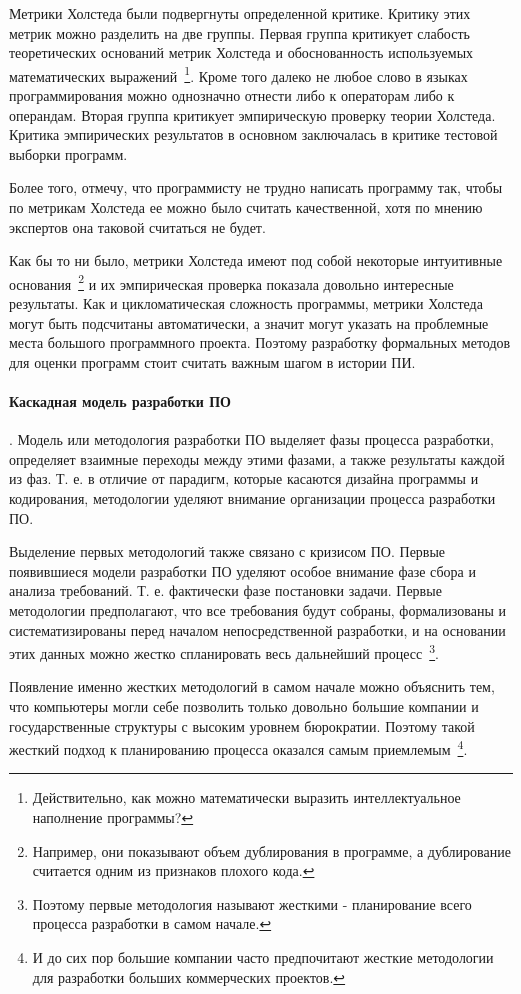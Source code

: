 Метрики Холстеда были подвергнуты определенной критике. Критику этих метрик можно разделить на две группы. Первая группа критикует слабость теоретических оснований метрик Холстеда и обоснованность используемых математических выражений~\footnote{Действительно, как можно математически выразить интеллектуальное наполнение программы?}. Кроме того далеко не любое слово в языках программирования можно однозначно отнести либо к операторам либо к операндам. Вторая группа критикует эмпирическую проверку теории Холстеда. Критика эмпирических результатов в основном заключалась в критике тестовой выборки программ.

Более того, отмечу, что программисту не трудно написать программу так, чтобы по метрикам Холстеда ее можно было считать качественной, хотя по мнению экспертов она таковой считаться не будет.

Как бы то ни было, метрики Холстеда имеют под собой некоторые интуитивные основания~\footnote{Например, они показывают объем дублирования в программе, а дублирование считается одним из признаков плохого кода.} и их эмпирическая проверка показала довольно интересные результаты. Как и цикломатическая сложность программы, метрики Холстеда могут быть подсчитаны автоматически, а значит могут указать на проблемные места большого программного проекта. Поэтому разработку формальных методов для оценки программ стоит считать важным шагом в истории ПИ.

\paragraph{Каскадная модель разработки ПО}. Модель или методология разработки ПО выделяет фазы процесса разработки, определяет взаимные переходы между этими фазами, а также результаты каждой из фаз. Т. е. в отличие от парадигм, которые касаются дизайна программы и кодирования, методологии уделяют внимание организации процесса разработки ПО.

Выделение первых методологий также связано с кризисом ПО. Первые появившиеся модели разработки ПО уделяют особое внимание фазе сбора и анализа требований. Т. е. фактически фазе постановки задачи. Первые методологии предполагают, что все требования будут собраны, формализованы и систематизированы перед началом непосредственной разработки, и на основании этих данных можно жестко спланировать весь дальнейший процесс~\footnote{Поэтому первые методология называют жесткими - планирование всего процесса разработки в самом начале.}.

Появление именно жестких методологий в самом начале можно объяснить тем, что компьютеры могли себе позволить только довольно большие компании и государственные структуры с высоким уровнем бюрократии. Поэтому такой жесткий подход к планированию процесса оказался самым приемлемым~\footnote{И до сих пор большие компании часто предпочитают жесткие методологии для разработки больших коммерческих проектов.}.

